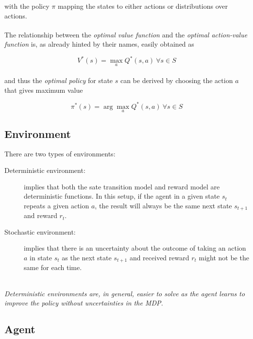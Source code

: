 with the policy $\pi$ mapping the states to either actions or distributions over actions. 
\\
\\
The relationship between the \textit{optimal value function} and the \textit{optimal action-value function} is, as already hinted by their names, easily obtained as

\begin{equation}
V^*(s)=\max_{a}Q^*(s,a)\ \forall{s}\in{S}
\end{equation}
\\
and thus the \textit{optimal policy} for state $s$ can be derived by choosing the action $a$ that gives maximum value

\begin{equation}
\pi^*(s)=\arg \max_{a} Q^*(s, a)\ \forall{s}\in{S}
\end{equation}

\subsection{Environment}

There are two types of environments:
\begin{description}
    \item[Deterministic environment:] implies that both the sate transition model and reward model are deterministic functions. 
    In this setup, if the agent in a given state $s_t$ repeats a given action $a$, the result will always be the same next state $s_{t+1}$ and reward $r_t$.

    \item[Stochastic environment:] implies that there is an uncertainty about the outcome of taking an action $a$ in state $s_t$ as the next state $s_{t+1}$ and received reward $r_t$ might not be the same for each time.
\end{description}
\hfill
\\
\textit{Deterministic environments are, in general, easier to solve as the agent learns to improve the policy without uncertainties in the MDP. }

\subsection{Agent}

